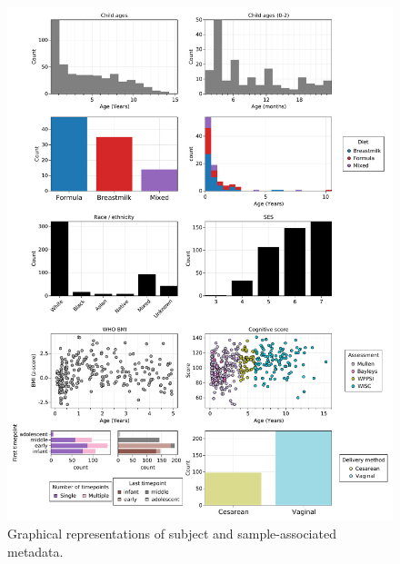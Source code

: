 \documentclass[fleqn,10pt]{wlscirep}
\begin{document}
\begin{figure}[ht]
\centering
\includegraphics[width=\linewidth]{../figures/05_data_summaries}
\caption{
    Graphical representations of subject and sample-associated metadata.
}
\label{fig:data}
\end{figure}
\end{document}
